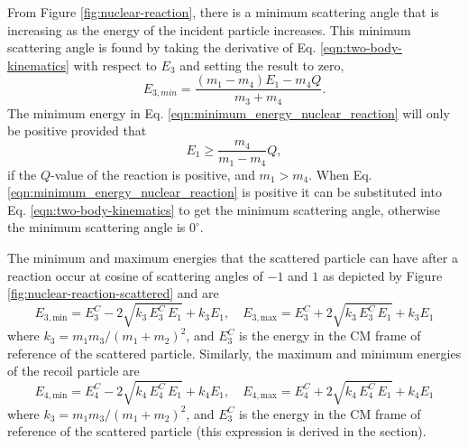 From Figure \ref{fig:nuclear-reaction}, there is a minimum scattering angle that is increasing as the energy of the incident particle increases. This minimum scattering angle is found by taking the derivative of Eq. \eqref{eqn:two-body-kinematics} with respect to $E_3$ and setting the result to zero, 
\begin{equation} \label{eqn:minimum_energy_nuclear_reaction}
  E_{3,min} = \dfrac{(m_1 - m_4)E_1 - m_4 Q}{m_3 + m_4}.
\end{equation}
The minimum energy in Eq. \eqref{eqn:minimum_energy_nuclear_reaction} will only be positive provided that 
\begin{equation}
  E_1 \geq \dfrac{m_4}{m_1 - m_4} Q,
\end{equation}
if the $Q$-value of the reaction is positive, and $m_1 > m_4$. When Eq. \eqref{eqn:minimum_energy_nuclear_reaction} is positive it can be substituted into Eq. \eqref{eqn:two-body-kinematics} to get the minimum scattering angle, otherwise the minimum scattering angle is $0^{\circ}$.

The minimum and maximum energies that the scattered particle can have after a reaction occur at cosine of scattering angles of $-1$ and $1$ as depicted by Figure \ref{fig:nuclear-reaction-scattered} and are
\begin{equation}
  E_{3,\text{min}} = E_3^C - 2 \sqrt{k_3 \, E_3^C \, E_1} + k_3 E_1, \quad E_{3,\text{max}} = E_3^C + 2 \sqrt{k_3 \, E_3^C \, E_1} + k_3 E_1
\end{equation}
where $k_3 = m_1 m_3 / (m_1+m_2)^2$, and $E_3^C$ is the energy in the CM frame of reference of the scattered particle. Similarly, the maximum and minimum energies of the recoil particle are
\begin{equation}
  E_{4,\text{min}} = E_4^C - 2 \sqrt{k_4 \, E_4^C \, E_1} + k_4 E_1, \quad E_{4,\text{max}} = E_4^C + 2 \sqrt{k_4 \, E_4^C \, E_1} + k_4 E_1
\end{equation}
where $k_3 = m_1 m_3 / (m_1+m_2)^2$, and $E_3^C$ is the energy in the CM frame of reference of the scattered particle (this expression is derived in the section).

